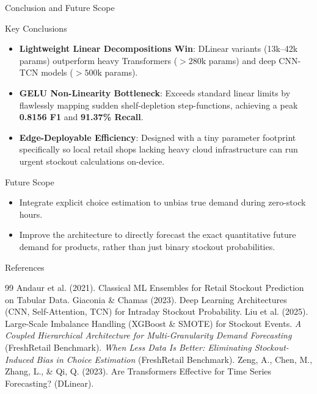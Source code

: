 \documentclass[10pt, aspectratio=169]{beamer}
\begin{document}
\begin{frame}{Conclusion and Future Scope}
  \begin{block}{Key Conclusions}
    \begin{itemize}
      \item \textbf{Lightweight Linear Decompositions Win}: DLinear variants (13k--42k params) outperform heavy Transformers ($>280\text{k}$ params) and deep CNN-TCN models ($>500\text{k}$ params).
      \item \textbf{GELU Non-Linearity Bottleneck}: Exceeds standard linear limits by flawlessly mapping sudden shelf-depletion step-functions, achieving a peak \textbf{0.8156 F1} and \textbf{91.37\% Recall}.
      \item \textbf{Edge-Deployable Efficiency}: Designed with a tiny parameter footprint specifically so local retail shops lacking heavy cloud infrastructure can run urgent stockout calculations on-device.
    \end{itemize}
  \end{block}
  
  \vspace{0.3cm}
  
  \begin{exampleblock}{Future Scope}
    \begin{itemize}
      \item Integrate explicit choice estimation to unbias true demand during zero-stock hours.
      \item Improve the architecture to directly forecast the exact quantitative future demand for products, rather than just binary stockout probabilities.
    \end{itemize}
  \end{exampleblock}
\end{frame}

\begin{frame}{References}
  \small
  \begin{thebibliography}{99}
     Andaur et al. (2021). Classical ML Ensembles for Retail Stockout Prediction on Tabular Data.
     Giaconia \& Chamas (2023). Deep Learning Architectures (CNN, Self-Attention, TCN) for Intraday Stockout Probability.
     Liu et al. (2025). Large-Scale Imbalance Handling (XGBoost \& SMOTE) for Stockout Events.
     \textit{A Coupled Hierarchical Architecture for Multi-Granularity Demand Forecasting} (FreshRetail Benchmark).
     \textit{When Less Data Is Better: Eliminating Stockout-Induced Bias in Choice Estimation} (FreshRetail Benchmark).
     Zeng, A., Chen, M., Zhang, L., \& Qi, Q. (2023). Are Transformers Effective for Time Series Forecasting? (DLinear).
  \end{thebibliography}
\end{frame}
\end{document}
